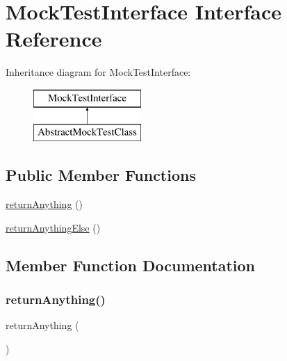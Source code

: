 \hypertarget{interface_mock_test_interface}{}\section{Mock\+Test\+Interface Interface Reference}
\label{interface_mock_test_interface}
Inheritance diagram for Mock\+Test\+Interface\+:\begin{figure}[H]
\begin{center}
\leavevmode
\includegraphics[height=2.000000cm]{interface_mock_test_interface}
\end{center}
\end{figure}
\subsection*{Public Member Functions}
\begin{DoxyCompactItemize}
\item 
\mbox{\hyperlink{interface_mock_test_interface_a92fcad527108f0c33114b9b5efcf54f2}{return\+Anything}} ()
\item 
\mbox{\hyperlink{interface_mock_test_interface_aa111c1d8db9d090bddaeb28f48abf3a5}{return\+Anything\+Else}} ()
\end{DoxyCompactItemize}


\subsection{Member Function Documentation}
\mbox{\label{interface_mock_test_interface_a92fcad527108f0c33114b9b5efcf54f2}} 
\subsubsection{\texorpdfstring{return\+Anything()}{returnAnything()}}
{\footnotesize\ttfamily return\+Anything (\begin{DoxyParamCaption}{ }\end{DoxyParamCaption})}



